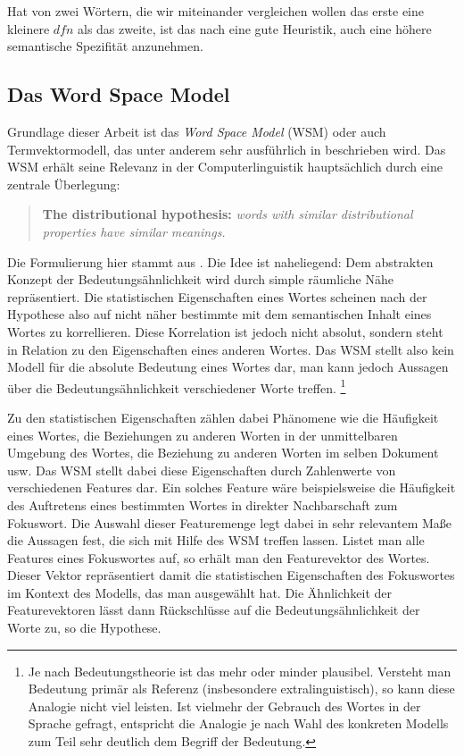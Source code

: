 \documentclass[11pt,numbers=noenddot]{scrartcl}
\begin{document}
Hat von zwei Wörtern, die wir miteinander vergleichen wollen das erste eine kleinere $dfn$ als das zweite, ist das nach \citet{Caraballo99determiningthe} eine gute Heuristik, auch eine höhere semantische Spezifität anzunehmen.

\subsection{Das Word Space Model}\label{wsm}
Grundlage dieser Arbeit ist das \emph{Word Space Model} (WSM) oder auch Termvektormodell, das unter anderem sehr ausführlich in \citet{sahlgren2006word} beschrieben wird. Das WSM erhält seine Relevanz in der Computerlinguistik hauptsächlich durch eine zentrale Überlegung:
\begin{quote}
    \textbf{The distributional hypothesis:} \emph{words with similar distributional properties have similar meanings.}
\end{quote}
Die Formulierung hier stammt aus \citet[S. 21]{sahlgren2006word}. Die Idee ist naheliegend: Dem abstrakten Konzept der Bedeutungsähnlichkeit wird durch simple räumliche Nähe repräsentiert. Die statistischen Eigenschaften eines Wortes scheinen nach der Hypothese also auf nicht näher bestimmte mit dem semantischen Inhalt eines Wortes zu korrellieren. Diese Korrelation ist jedoch nicht absolut, sondern steht in Relation zu den Eigenschaften eines anderen Wortes. Das WSM stellt also kein Modell für die absolute Bedeutung eines Wortes dar, man kann jedoch Aussagen über die Bedeutungsähnlichkeit verschiedener Worte treffen. \footnote{Je nach Bedeutungstheorie ist das mehr oder minder plausibel. Versteht man Bedeutung primär als Referenz (insbesondere extralinguistisch), so kann diese Analogie nicht viel leisten. Ist vielmehr der Gebrauch des Wortes in der Sprache gefragt, entspricht die Analogie je nach Wahl des konkreten Modells zum Teil sehr deutlich dem Begriff der Bedeutung.}

Zu den statistischen Eigenschaften zählen dabei Phänomene wie die Häufigkeit eines Wortes, die Beziehungen zu anderen Worten in der unmittelbaren Umgebung des Wortes, die Beziehung zu anderen Worten im selben Dokument usw. Das WSM stellt dabei diese Eigenschaften durch Zahlenwerte von verschiedenen Features dar. Ein solches Feature wäre beispielsweise die Häufigkeit des Auftretens eines bestimmten Wortes in direkter Nachbarschaft zum Fokuswort. Die Auswahl dieser Featuremenge legt dabei in sehr relevantem Maße die Aussagen fest, die sich mit Hilfe des WSM treffen lassen. Listet man alle Features eines Fokuswortes auf, so erhält man den Featurevektor des Wortes. Dieser Vektor repräsentiert damit die statistischen Eigenschaften des Fokuswortes im Kontext des Modells, das man ausgewählt hat. Die Ähnlichkeit der Featurevektoren lässt dann Rückschlüsse auf die Bedeutungsähnlichkeit der Worte zu, so die Hypothese.
\end{document}
